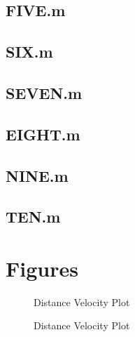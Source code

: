 \documentclass{article}
\begin{document}
\subsection{FIVE.m}
\pagebreak



\subsection{SIX.m}
\pagebreak


\subsection{SEVEN.m}
\pagebreak

\subsection{EIGHT.m}
\pagebreak

\subsection{NINE.m}
\pagebreak

\subsection{TEN.m}
\pagebreak






\section{Figures}
\begin{figure}[h!]
\begin{center}
\caption{Distance Velocity Plot}
\end{center}
\end{figure}



\begin{figure}[h!]
\begin{center}
\caption{Distance Velocity Plot}
\end{center}
\end{figure}
\end{document}

